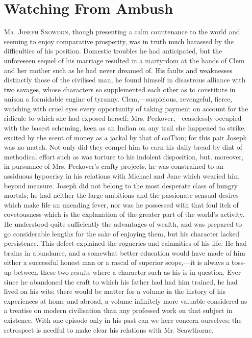 \chapter{Watching From Ambush}

\textsc{Mr. Joseph Snowdon}, though presenting a calm countenance to the
world and seeming to enjoy comparative prosperity, was in truth much
harassed by the difficulties of his position. Domestic troubles he had
anticipated, but the unforeseen sequel of his marriage resulted in a
martyrdom at the hands of Clem and her mother such as he had never
dreamed of. His faults and weaknesses distinctly those of the civilised
man, he found himself in disastrous alliance with two savages, whose
characters so supplemented each other as to constitute in unison a
formidable engine of tyranny. Clem,---suspicious, revengeful, fierce,
watching with cruel eyes every opportunity of taking payment on account
for the ridicule to which she had exposed herself; {}Mrs.
Peckover,---ceaselessly occupied with the basest scheming, keen as an
Indian on any trail she happened to strike, excited by the scent of
money as a jackal by that of caiTion; for this pair Joseph was no match.
Not only did they compel him to earn his daily bread by dint of
methodical effort such as was torture to his indolent disposition, but,
moreover, in pursuance of Mrs. Peckover's crafty projects, he was
constrained to an assiduous hypocrisy in his relations with Michael and
Jane which wearied him beyond measure. Joseph did not belong to the most
desperate class of hungry mortals; he had neither the large ambitions
and the passionate sensual desires which make life an unending fever,
nor was he possessed with that foul itch of covetousness which is the
explanation of the greater part of the world's activity. He understood
quite sufficiently the advantages of wealth, and was prepared to go
considerable lengths for the sake of enjoying them, but his character
lacked persistence. This defect explained the rogueries and calamities
of his {}life. He had brains in abundance, and a somewhat better
education would have made of him either a successful honest man or a
rascal of superior scope,---it is always a toss-up between these two
results where a character such as his is in question. Ever since he
abandoned the craft to which his father had had him trained, he had
lived on his wits; there would be matter for a volume in the history of
his experiences at home and abroad, a volume infinitely more valuable
considered as a treatise on modern civilisation than any professed work
on that subject in existence. With one episode only in his past can we
here concern ourselves; the retrospect is needful to make clear his
relations with Mr. Scawthorne.

